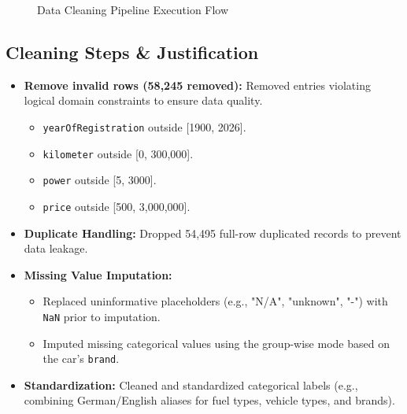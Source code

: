 \documentclass[12pt, a4paper]{article}
\begin{document}
\begin{figure}[htpb]
\caption{Data Cleaning Pipeline Execution Flow}
\label{fig:cleaning_pipeline}
\end{figure}
\newpage
\subsection{Cleaning Steps \& Justification}
\begin{itemize}
  \item \textbf{Remove invalid rows (58,245 removed):} Removed entries violating logical domain constraints to ensure data quality.
  \begin{itemize}
    \item \texttt{yearOfRegistration} outside [1900, 2026].
    \item \texttt{kilometer} outside [0, 300,000].
    \item \texttt{power} outside [5, 3000].
    \item \texttt{price} outside [500, 3,000,000].
  \end{itemize}
  \item \textbf{Duplicate Handling:} Dropped 54,495 full-row duplicated records to prevent data leakage.
  \item \textbf{Missing Value Imputation:}
  \begin{itemize}
      \item Replaced uninformative placeholders (e.g., "N/A", "unknown", "-") with \texttt{NaN} prior to imputation.
      \item Imputed missing categorical values using the group-wise mode based on the car's \texttt{brand}.
  \end{itemize}
  \item \textbf{Standardization:} Cleaned and standardized categorical labels (e.g., combining German/English aliases for fuel types, vehicle types, and brands).
\end{itemize}
\end{document}
